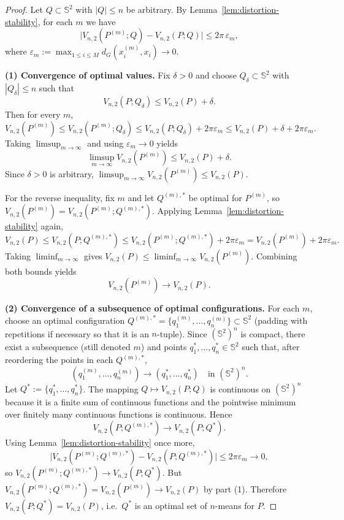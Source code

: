 \documentclass[12pt, reqno]{amsart}
\theoremstyle{plain}
\theoremstyle{definition}
\newcommand{\D}[1]{\mathbb{#1}}%
\begin{document}
\begin{proof}
Let $Q\subset \D S^2$ with $|Q|\le n$ be arbitrary. By Lemma~\ref{lem:distortion-stability}, for each $m$ we have
\[
\big|V_{n,2}(P^{(m)};Q)-V_{n,2}(P;Q)\big|\le 2\pi\,\varepsilon_m,
\]
where $\varepsilon_m:=\max_{1\le i\le M} d_G(x_i^{(m)},x_i)\to 0$.

\smallskip
\noindent\textbf{(1) Convergence of optimal values.}
Fix $\delta>0$ and choose $Q_\delta\subset \D S^2$ with $|Q_\delta|\le n$ such that
\[
V_{n,2}(P;Q_\delta)\le V_{n,2}(P)+\delta.
\]
Then for every $m$,
\[
V_{n,2}(P^{(m)})\le V_{n,2}(P^{(m)};Q_\delta)
\le V_{n,2}(P;Q_\delta)+2\pi\varepsilon_m
\le V_{n,2}(P)+\delta+2\pi\varepsilon_m.
\]
Taking $\limsup_{m\to\infty}$ and using $\varepsilon_m\to 0$ yields
\[
\limsup_{m\to\infty} V_{n,2}(P^{(m)})\le V_{n,2}(P)+\delta.
\]
Since $\delta>0$ is arbitrary, $\limsup_{m\to\infty} V_{n,2}(P^{(m)})\le V_{n,2}(P)$.

For the reverse inequality, fix $m$ and let $Q^{(m),*}$ be optimal for $P^{(m)}$, so
$V_{n,2}(P^{(m)})=V_{n,2}(P^{(m)};Q^{(m),*})$. Applying Lemma~\ref{lem:distortion-stability} again,
\[
V_{n,2}(P)\le V_{n,2}(P;Q^{(m),*})
\le V_{n,2}(P^{(m)};Q^{(m),*})+2\pi\varepsilon_m
=V_{n,2}(P^{(m)})+2\pi\varepsilon_m.
\]
Taking $\liminf_{m\to\infty}$ gives $V_{n,2}(P)\le \liminf_{m\to\infty}V_{n,2}(P^{(m)})$.
Combining both bounds yields
\[
V_{n,2}(P^{(m)})\longrightarrow V_{n,2}(P).
\]

\smallskip
\noindent\textbf{(2) Convergence of a subsequence of optimal configurations.}
For each $m$, choose an optimal configuration
$Q^{(m),*}=\{q^{(m)}_1,\dots,q^{(m)}_n\}\subset \D S^2$ (padding with repetitions if necessary so that
it is an $n$-tuple). Since $(\D S^2)^n$ is compact, there exist a subsequence (still denoted $m$) and
points $q^*_1,\dots,q^*_n\in \D S^2$ such that, after reordering the points in each $Q^{(m),*}$,
\[
(q^{(m)}_1,\dots,q^{(m)}_n)\longrightarrow (q^*_1,\dots,q^*_n)\quad \text{in }(\D S^2)^n.
\]
Let $Q^*:=\{q^*_1,\dots,q^*_n\}$. The mapping $Q\mapsto V_{n,2}(P;Q)$ is continuous on $(\D S^2)^n$
because it is a finite sum of continuous functions and the pointwise minimum over finitely many
continuous functions is continuous. Hence
\[
V_{n,2}(P;Q^{(m),*})\longrightarrow V_{n,2}(P;Q^*).
\]
Using Lemma~\ref{lem:distortion-stability} once more,
\[
\big|V_{n,2}(P^{(m)};Q^{(m),*})-V_{n,2}(P;Q^{(m),*})\big|\le 2\pi\varepsilon_m\to 0,
\]
so $V_{n,2}(P^{(m)};Q^{(m),*})\to V_{n,2}(P;Q^*)$. But
$V_{n,2}(P^{(m)};Q^{(m),*})=V_{n,2}(P^{(m)})\to V_{n,2}(P)$ by part (1). Therefore
$V_{n,2}(P;Q^*)=V_{n,2}(P)$, i.e.\ $Q^*$ is an optimal set of $n$-means for $P$.
\end{proof}
\end{document}
